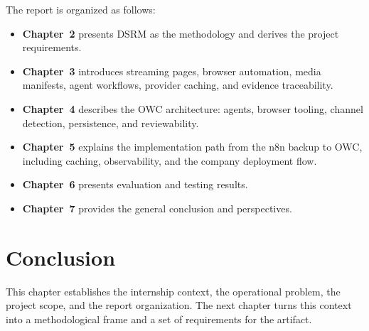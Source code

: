 The report is organized as follows:
\begin{itemize}
  \item \textbf{Chapter~2} presents DSRM as the methodology and derives the project
  requirements.
  \item \textbf{Chapter~3} introduces streaming pages, browser automation, media
  manifests, agent workflows, provider caching, and evidence traceability.
  \item \textbf{Chapter~4} describes the OWC architecture: agents, browser tooling,
  channel detection, persistence, and reviewability.
  \item \textbf{Chapter~5} explains the implementation path from the n8n backup to OWC,
  including caching, observability, and the company deployment flow.
  \item \textbf{Chapter~6} presents evaluation and testing results.
  \item \textbf{Chapter~7} provides the general conclusion and perspectives.
\end{itemize}



\section{Conclusion}

This chapter establishes the internship context, the operational problem, the project
scope, and the report organization. The next chapter turns this context into a
methodological frame and a set of requirements for the artifact.

